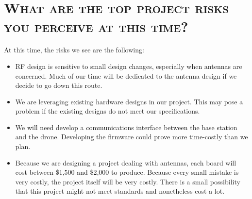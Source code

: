 \documentclass[11pt]{article}
\numberwithin{figure}{section}
\begin{document}
\section{\textsc{What are the top project risks you perceive at this time?}}
	At this time, the risks we see are the following:
	\begin{itemize}
		\item RF design is sensitive to small design changes, especially when antennas are concerned.  Much of our time will be dedicated to the antenna design if we decide to go down this route.
		\item We are leveraging existing hardware designs in our project.  This may pose a problem if the existing designs do not meet our specifications.
		\item We will need develop a communications interface between the base station and the drone.  Developing the firmware could prove more time-costly than we plan.
		\item Because we are designing a project dealing with antennas, each board will cost between \$1,500 and \$2,000 to produce. Because every small mistake is very costly, the project itself will be very costly. There is a small possibility that this project might not meet standards and nonetheless cost a lot.
	\end{itemize}
\end{document}
